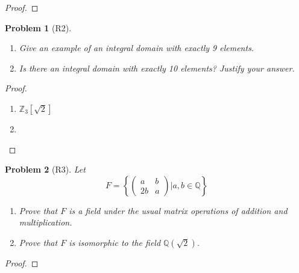 \documentclass[10pt]{article}
\newcommand{\sk}{\vskip 10mm}
\newcommand{\bb}[1]{\mathbb{#1}}
\theoremstyle{plain}
\newtheorem{problem}{Problem}
\theoremstyle{remark}
\begin{document}
\begin{proof}
  
\end{proof}

\sk

\begin{problem}[R2]
  \begin{enumerate}
  \item Give an example of an integral domain with exactly 9 elements.
  \item Is there an integral domain with exactly 10 elements? Justify
    your answer.
  \end{enumerate}
\end{problem}

\begin{proof}
  \begin{enumerate}
  \item $\bb{Z}_3[\sqrt{2}]$
  \item
  \end{enumerate}
\end{proof}

\sk

\begin{problem}[R3]
  Let
  \[
    F =
    \left\{\left(
        \begin{array}{cc}
          a&b\\
          2b&a
        \end{array}
      \right)| a,b\in \bb{Q}\right\}
  \]
  \begin{enumerate}
  \item Prove that $F$ is a field under the usual matrix operations of addition
    and multiplication.
  \item Prove that $F$ is isomorphic to the field $\bb{Q}(\sqrt{2})$.
  \end{enumerate}
\end{problem}

\begin{proof}
  
\end{proof}

\sk

\end{document}
